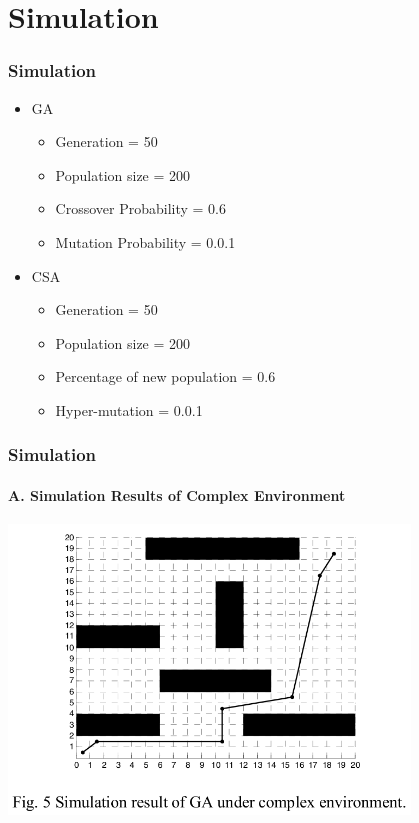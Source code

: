 \section{Simulation}

\frame
{
\frametitle{Simulation}
\begin{itemize}
	\item GA
	\begin{itemize}
		\item Generation = 50
		\item Population size = 200
		\item Crossover Probability = 0.6
		\item Mutation Probability = 0.0.1
	\end{itemize}
	\item CSA
	\begin{itemize}
		\item Generation = 50
		\item Population size = 200
		\item Percentage of new population = 0.6
		\item Hyper-mutation = 0.0.1
	\end{itemize}
\end{itemize}
}

\frame
{
\frametitle{Simulation}
\framesubtitle{A. Simulation Results of Complex Environment}
\begin{center}
	\includegraphics[width=0.8\textwidth]{img/garesult}
\end{center}
}


